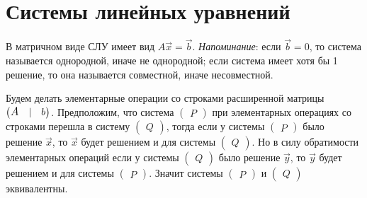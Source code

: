 \section{Системы линейных уравнений}
\label{Системы линейных уравнений.}
В матричном виде СЛУ имеет вид $A\vec{x}=\vec{b}$. \textit{Напоминание}: если $\vec{b}=0$, то система называется однородной, иначе не однородной; если система имеет хотя бы 1 решение, то она называется совместной, иначе несовместной.

Будем делать элементарные операции со строками расширенной матрицы $\left( \begin{matrix} \text{\large \textit{A}} & |& b \end{matrix} \right)$. Предположим, что система $\left( \begin{matrix} P\end{matrix} \right)$ при элементарных операциях со строками перешла в систему $\left( \begin{matrix} Q\end{matrix} \right)$,  тогда если у системы $\left( \begin{matrix} P\end{matrix} \right)$ было решение $\vec{x}$, то $\vec{x}$ будет решением и для системы $\left( \begin{matrix} Q\end{matrix} \right)$. Но в силу обратимости элементарных операций если у  системы $\left( \begin{matrix} Q\end{matrix} \right)$ было решение $\vec{y}$, то $\vec{y}$ будет решением и для системы $\left( \begin{matrix} P\end{matrix} \right)$. Значит системы $\left( \begin{matrix} P\end{matrix} \right)$ и $\left( \begin{matrix} Q\end{matrix} \right)$ эквивалентны.

